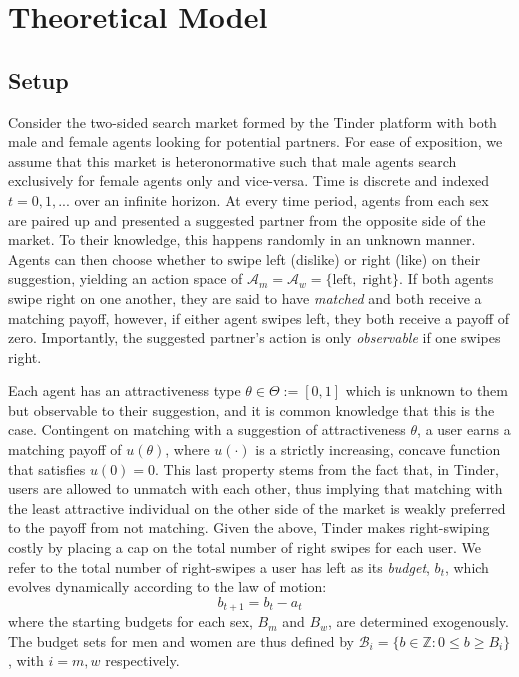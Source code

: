 \section{Theoretical Model}
\label{sec: figs tables algos}
\subsection{Setup} 
Consider the two-sided search market formed by the Tinder platform with both male and female agents looking for potential partners. For ease of exposition, we assume that this market is heteronormative such that male agents search exclusively for female agents only and vice-versa. Time is discrete and indexed $t=0,1,...$ over an infinite horizon. At every time period, agents from each sex are paired up and presented a suggested partner from the opposite side of the market. To their knowledge, this happens randomly in an unknown manner. Agents can then choose whether to swipe left (dislike) or right (like) on their suggestion, yielding an action space of $\mathcal{A}_m=\mathcal{A}_w=\{ \text{left},\; \text{right}\}$. If both agents swipe right on one another, they are said to have \textit{matched} and both receive a matching payoff, however, if either agent swipes left, they both receive a payoff of zero. Importantly, the suggested partner’s action is only \textit{observable} if one swipes right.

Each agent has an attractiveness type $\theta \in \Theta := [0,1]$ which is unknown to them but observable to their suggestion, and it is common knowledge that this is the case. Contingent on matching with a suggestion of attractiveness $\theta$, a user earns a matching payoff of $u(\theta)$, where $u(\cdot)$ is a strictly increasing, concave function that satisfies $u(0) = 0$. This last property stems from the fact that, in Tinder, users are allowed to unmatch with each other, thus implying that matching with the least attractive individual on the other side of the market is weakly preferred to the payoff from not matching. Given the above, Tinder makes right-swiping costly by placing a cap on the total number of right swipes for each user. We refer to the total number of right-swipes a user has left as its \textit{budget}, $b_t$, which evolves dynamically according to the law of motion:
$$
  b_{t+1}= b_{t}- a_{t}
$$
where the starting budgets for each sex, $B_{m}$ and $B_{w}$, are determined exogenously. The budget sets for men and women are thus defined by $\mathcal{B}_{i}=\{b \in \mathbb{Z} : 0\leq b \geq B_i\}$, with $i=m,w$ respectively. 

